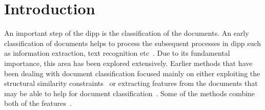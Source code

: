 \section{Introduction}

An important step of the \ac{dipp} is the classification of the documents. 
An early classification of documents helps to process the subsequent processes in \ac{dipp} such as information extraction, text recognition etc~\cite{doclass_Dengel95}. Due to its fundamental importance, this area has been explored extensively. 
Earlier methods that have been dealing with document classification focused mainly on either exploiting the structural similarity constraints~\cite{doclass_Byun2000, doclass_shin} or extracting features from the documents that may be able to help for  document classification~\cite{doclass_Kumar12, doclass_Chen12, doclass_Kumar14}.
Some of the methods  combine both of the features~\cite{Collins-thompson02aclustering-based}.


